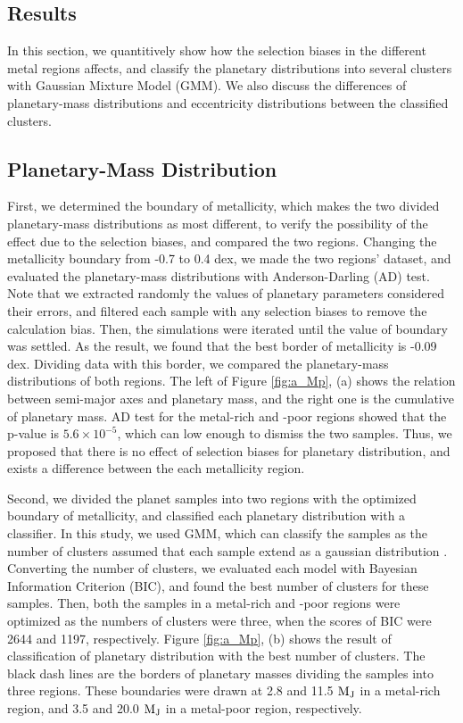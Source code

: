 \documentclass[twocolumn, dvipdfmx]{aastex62}
\begin{document}
\begin{CJK*}{UTF8}{min}
\section{Results} \label{sec:results}

In this section, we quantitively show how the selection biases in the different metal regions affects, and classify the planetary distributions into several clusters with Gaussian Mixture Model (GMM). We also discuss the differences of planetary-mass distributions and eccentricity distributions between the classified clusters.


\subsection{Planetary-Mass Distribution} \label{subsec:mass}

First, we determined the boundary of metallicity, which makes the two divided planetary-mass distributions as most different, to verify the possibility of the effect due to the selection biases, and compared the two regions. Changing the metallicity boundary from -0.7 to 0.4 dex, we made the two regions' dataset, and evaluated the planetary-mass distributions with Anderson-Darling (AD) test. Note that we extracted randomly the values of planetary parameters considered their errors, and filtered each sample with any selection biases to remove the calculation bias. Then, the simulations were iterated until the value of boundary was settled. As the result, we found that the best border of metallicity is -0.09 dex. Dividing data with this border, we compared the planetary-mass distributions of both regions. The left of Figure \ref{fig:a_Mp}, (a) shows the relation between semi-major axes and planetary mass, and the right one is the cumulative of planetary mass. AD test for the metal-rich and -poor regions showed that the p-value is $5.6\times10^{-5}$, which can low enough to dismiss the two samples. Thus, we proposed that there is no effect of selection biases for planetary distribution, and exists a difference between the each metallicity region.

Second, we divided the planet samples into two regions with the optimized boundary of metallicity, and classified each planetary distribution with a classifier. In this study, we used GMM, which can classify the samples as the number of clusters assumed that each sample extend as a gaussian distribution \citep[e.g.,][]{2012MNRAS.424.2832L}. Converting the number of clusters, we evaluated each model with Bayesian Information Criterion (BIC), and found the best number of clusters for these samples. Then, both the samples in a metal-rich and -poor regions were optimized as the numbers of clusters were three, when the scores of BIC were 2644 and 1197, respectively.  Figure \ref{fig:a_Mp}, (b) shows the result of classification of planetary distribution with the best number of clusters. The black dash lines are the borders of planetary masses dividing the samples into three regions. These boundaries were drawn at 2.8 and 11.5 $\rm M_J$ in a metal-rich region, and 3.5 and 20.0 $\rm M_J$ in a metal-poor region, respectively.


\end{CJK*}
\end{document}
